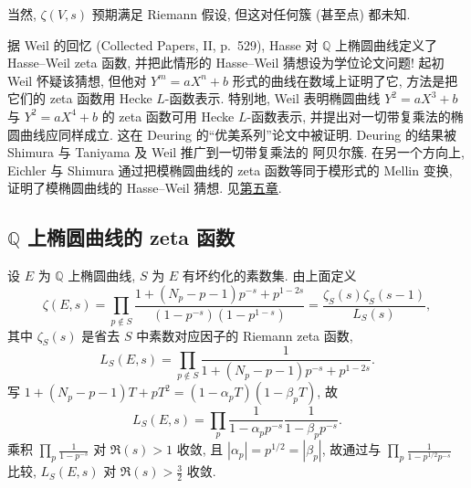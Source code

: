 当然, $\zeta(V, s)$ 预期满足 Riemann 假设, 但这对任何簇 (甚至点) 都未知.

\begin{remarkstar}
据 Weil 的回忆 (Collected Papers, II, p.~529), Hasse 对 $\mathbb{Q}$ 上椭圆曲线定义了 Hasse--Weil zeta 函数, 并把此情形的 Hasse--Weil 猜想设为学位论文问题! 起初 Weil 怀疑该猜想, 但他对 $Y^m = aX^n + b$ 形式的曲线在数域上证明了它, 方法是把它们的 zeta 函数用 Hecke $L$-函数表示. 特别地, Weil 表明椭圆曲线 $Y^2 = aX^3 + b$ 与 $Y^2 = aX^4 + b$ 的 zeta 函数可用 Hecke $L$-函数表示, 并提出对一切带复乘法的椭圆曲线应同样成立. 这在 Deuring 的``优美系列''论文中被证明. Deuring 的结果被 Shimura 与 Taniyama 及 Weil 推广到一切带复乘法的 阿贝尔簇. 在另一个方向上, Eichler 与 Shimura 通过把模椭圆曲线的 zeta 函数等同于模形式的 Mellin 变换, 证明了模椭圆曲线的 Hasse--Weil 猜想. 见\hyperref[ch:5]{第五章}.
\end{remarkstar}

\subsection*{$\mathbb{Q}$ 上椭圆曲线的 zeta 函数}

设 $E$ 为 $\mathbb{Q}$ 上椭圆曲线, $S$ 为 $E$ 有坏约化的素数集. 由上面定义
\[
\zeta(E, s) = \prod_{p\notin S}\frac{1 + (N_p - p - 1)p^{-s} + p^{1-2s}}{(1-p^{-s})(1-p^{1-s})}
= \frac{\zeta_S(s)\zeta_S(s-1)}{L_S(s)},
\]
其中 $\zeta_S(s)$ 是省去 $S$ 中素数对应因子的 Riemann zeta 函数,
\[
L_S(E, s) = \prod_{p\notin S}\frac{1}{1 + (N_p - p - 1)p^{-s} + p^{1-2s}}.
\]
写 $1 + (N_p - p - 1)T + pT^2 = (1-\alpha_pT)(1-\beta_pT)$, 故
\[
L_S(E, s) = \prod_p\frac{1}{1-\alpha_pp^{-s}}\frac{1}{1-\beta_pp^{-s}}.
\]
乘积 $\prod_p\frac{1}{1-p^{-s}}$ 对 $\Re(s) > 1$ 收敛, 且 $|\alpha_p| = p^{1/2} = |\beta_p|$, 故通过与 $\prod_p\frac{1}{1-p^{1/2}p^{-s}}$ 比较, $L_S(E, s)$ 对 $\Re(s) > \frac{3}{2}$ 收敛.

